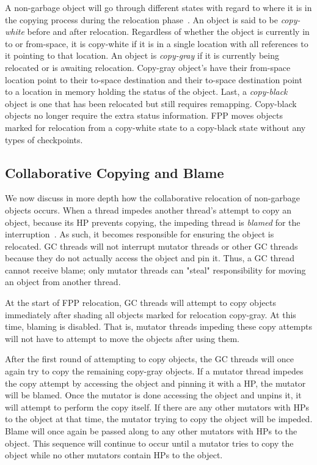 \documentclass{sig-alternate}
\begin{document}
A non-garbage object will go through different states with regard to where it is 
in the copying process during the relocation phase~\cite{Osterlund:FPP}. An object is said to be
\emph{copy-white} before and after relocation. Regardless of whether the object is
currently in to or from-space, it is copy-white if it is in a single location with all
references to it pointing to that location. An object is \emph{copy-gray} if it is currently
being relocated or is awaiting relocation. Copy-gray object's have their from-space location
point to their to-space destination and their to-space destination point to a location in
memory holding the status of the object. Last, a \emph{copy-black} object is one that has
been relocated but still requires remapping. Copy-black objects no longer require the extra
status information. FPP moves objects marked for relocation from a copy-white state to
a copy-black state without any types of checkpoints.


\subsection{Collaborative Copying and Blame}
\label{sec:fppCopy}

We now discuss in more depth how the collaborative relocation of 
non-garbage objects occurs. When a thread impedes another thread's
attempt to copy an object, because its HP prevents copying,
the impeding thread is \emph{blamed} for the 
interruption~\cite{Osterlund:FPP}. As such, it becomes responsible for ensuring 
the object is relocated. GC threads will not interrupt
mutator threads or other GC threads because they do not actually access 
the object and pin it. Thus, a GC thread cannot receive blame;
only mutator threads can "steal" responsibility for moving an object
from another thread. 

At the start of FPP relocation, GC threads will attempt to copy
objects immediately after shading all objects marked for relocation
copy-gray. At this time, blaming is disabled. That is, mutator threads
impeding these copy attempts will not have to attempt to move the objects
after using them. 

After the first round of attempting to copy objects, the GC threads
will once again try to copy the remaining copy-gray objects. If a mutator 
thread impedes the copy attempt by accessing the object and pinning it with
a HP, the mutator will be blamed. Once the mutator is done accessing the
object and unpins it, it will attempt to perform the copy itself. If there
are any other mutators with HPs to the object at that time, the mutator 
trying to copy the object will be impeded. Blame will once again be passed
along to any other mutators with HPs to the object. This sequence will
continue to occur until a mutator tries to copy the object while no other
mutators contain HPs to the object. 
\end{document}
